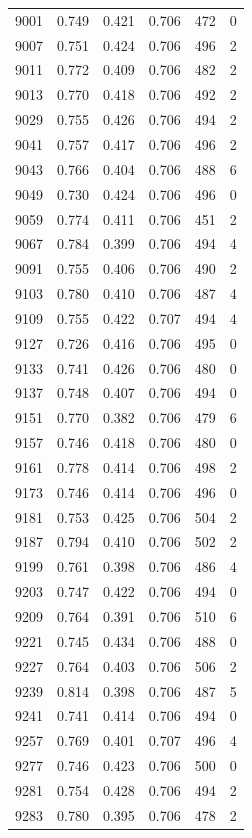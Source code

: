 \documentclass[11pt,a4paper,reqno]{amsart}
\theoremstyle{remark}
\numberwithin{equation}{section}
\begin{document}
\begin{table}[p]
\begin{tabular}{@{}rccccr@{}}
9001 & 0.749 & 0.421 & 0.706 & 472 & 0\\
9007 & 0.751 & 0.424 & 0.706 & 496 & 2\\
9011 & 0.772 & 0.409 & 0.706 & 482 & 2\\
9013 & 0.770 & 0.418 & 0.706 & 492 & 2\\
9029 & 0.755 & 0.426 & 0.706 & 494 & 2\\
9041 & 0.757 & 0.417 & 0.706 & 496 & 2\\
9043 & 0.766 & 0.404 & 0.706 & 488 & 6\\
9049 & 0.730 & 0.424 & 0.706 & 496 & 0\\
9059 & 0.774 & 0.411 & 0.706 & 451 & 2\\
9067 & 0.784 & 0.399 & 0.706 & 494 & 4\\
9091 & 0.755 & 0.406 & 0.706 & 490 & 2\\
9103 & 0.780 & 0.410 & 0.706 & 487 & 4\\
9109 & 0.755 & 0.422 & 0.707 & 494 & 4\\
9127 & 0.726 & 0.416 & 0.706 & 495 & 0\\
9133 & 0.741 & 0.426 & 0.706 & 480 & 0\\
9137 & 0.748 & 0.407 & 0.706 & 494 & 0\\
9151 & 0.770 & 0.382 & 0.706 & 479 & 6\\
9157 & 0.746 & 0.418 & 0.706 & 480 & 0\\
9161 & 0.778 & 0.414 & 0.706 & 498 & 2\\
9173 & 0.746 & 0.414 & 0.706 & 496 & 0\\
9181 & 0.753 & 0.425 & 0.706 & 504 & 2\\
9187 & 0.794 & 0.410 & 0.706 & 502 & 2\\
9199 & 0.761 & 0.398 & 0.706 & 486 & 4\\
9203 & 0.747 & 0.422 & 0.706 & 494 & 0\\
9209 & 0.764 & 0.391 & 0.706 & 510 & 6\\
9221 & 0.745 & 0.434 & 0.706 & 488 & 0\\
9227 & 0.764 & 0.403 & 0.706 & 506 & 2\\
9239 & 0.814 & 0.398 & 0.706 & 487 & 5\\
9241 & 0.741 & 0.414 & 0.706 & 494 & 0\\
9257 & 0.769 & 0.401 & 0.707 & 496 & 4\\
9277 & 0.746 & 0.423 & 0.706 & 500 & 0\\
9281 & 0.754 & 0.428 & 0.706 & 494 & 2\\
9283 & 0.780 & 0.395 & 0.706 & 478 & 2\\

\end{tabular}
\end{table}
\end{document}
